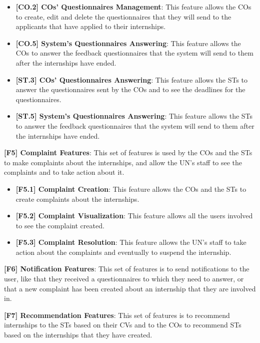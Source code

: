 \begin{itemize}
    \item \textbf{[CO.2] COs' Questionnaires Management}: This feature allows the COs to create, edit and delete the
          questionnaires that they will send to the applicants that have applied to their internships.
    \item \textbf{[CO.5] System's Questionnaires Answering}: This feature allows the COs to answer the feedback
          questionnaires that the system will send to them after the internships have ended.
    \item \textbf{[ST.3] COs' Questionnaires Answering}: This feature allows the STs to answer the questionnaires sent by
          the COs and to see the deadlines for the questionnaires.
    \item \textbf{[ST.5] System's Questionnaires Answering}: This feature allows the STs to answer the feedback
          questionnaires that the system will send to them after the internships have ended.
          
\end{itemize}

\par \textbf{[F5] Complaint Features}: This set of features is used by the COs and the STs to make complaints about the
internships, and allow the UN's staff to see the complaints and to take action about it.

\begin{itemize}
    \item \textbf{[F5.1] Complaint Creation}: This feature allows the COs and the STs to create complaints about the
          internships.
    \item \textbf{[F5.2] Complaint Visualization}: This feature allows all the users involved to see the complaint
          created.
    \item \textbf{[F5.3] Complaint Resolution}: This feature allows the UN's staff to take action about the complaints
          and eventually to suspend the internship.
\end{itemize}

\par \textbf{[F6] Notification Features}: This set of features is to send notifications to the user, like 
that they received a questionnaires to which they need to answer, or that a new complaint has been created about an internship
that they are involved in.

\par \textbf{[F7] Recommendation Features}: This set of features is to recommend internships to the STs based on their
CVs and to the COs to recommend STs based on the internships that they have created.

